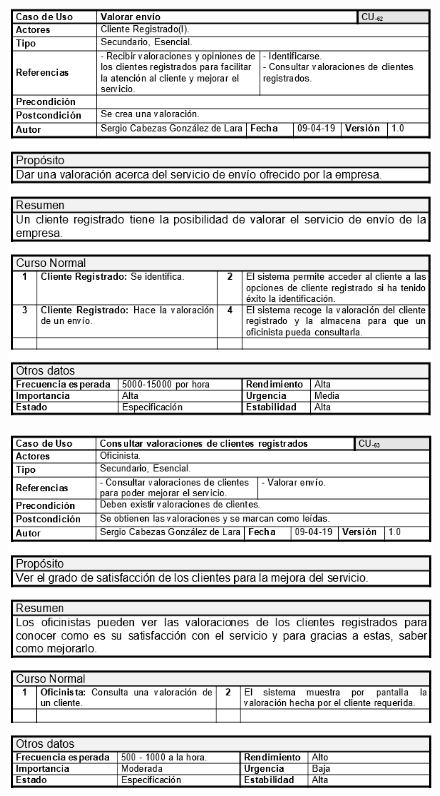 \begin{figure}[H]
	\centering
	\includegraphics[width=16cm]{62}
\end{figure}
\begin{figure}[H]
	\centering
	\includegraphics[width=16cm]{63}
\end{figure}
\newpage

